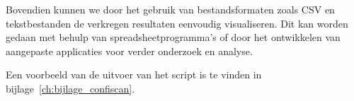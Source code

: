 Bovendien kunnen we door het gebruik van bestandsformaten zoals CSV en tekstbestanden de verkregen resultaten eenvoudig visualiseren.
Dit kan worden gedaan met behulp van spreadsheetprogramma's of door het ontwikkelen van aangepaste applicaties voor verder onderzoek en analyse.

Een voorbeeld van de uitvoer van het script is te vinden in bijlage~\ref{ch:bijlage_confiscan}.
